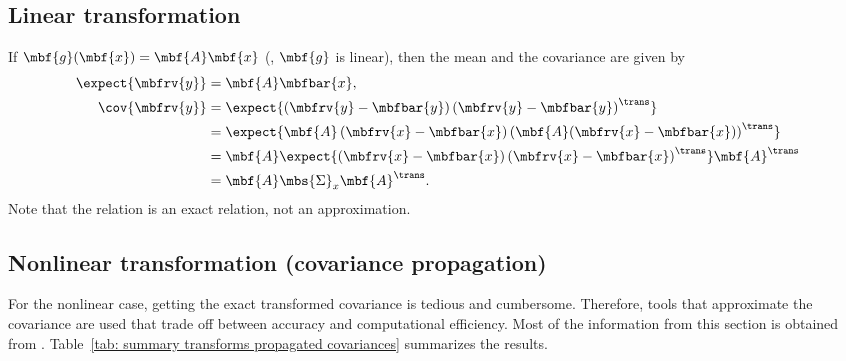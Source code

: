 \subsection{Linear transformation}
If $\mbf{g}(\mbf{x})=\mbf{A}\mbf{x}$ (\ie, $\mbf{g}$ is linear), then the mean and the covariance are given by
\begin{align}
    \expect{\mbfrv{y}} &= \mbf{A}\mbfbar{x},\\
    \cov{\mbfrv{y}} &= \expect{\left(\mbfrv{y}-\mbfbar{y}\right)\left(\mbfrv{y}-\mbfbar{y}\right)^{\trans}}\\
    &= \expect{\mbf{A}\left(\mbfrv{x}-\mbfbar{x}\right)\left(\mbf{A}(\mbfrv{x}-\mbfbar{x})\right)^{\trans}}\\
    &= \mbf{A}\expect{\left(\mbfrv{x}-\mbfbar{x}\right)\left(\mbfrv{x}-\mbfbar{x}\right)^{\trans}}\mbf{A}^{\trans}\\
    &= \mbf{A}\mbs{\Sigma}_{x}\mbf{A}^{\trans}.
\end{align}
Note that the relation is an exact relation, not an approximation.

\subsection{Nonlinear transformation (covariance propagation)}
For the nonlinear case, getting the exact transformed covariance is tedious and cumbersome.
Therefore, tools that approximate the covariance are used that trade off between accuracy and computational efficiency.
Most of the information from this section is obtained from \cite{gustafssonNonlinearTransformationsStochastic2008}.
Table~\ref{tab: summary transforms propagated covariances} summarizes the results.

